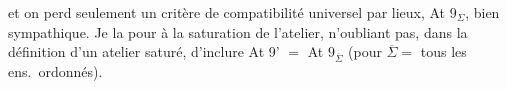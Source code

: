 \documentclass[11pt,a4paper]{article}
\begin{document}
et on perd seulement un critère de compatibilité universel par lieux, At $9_{\Sigma}$, bien sympathique. Je \ill{} la \ill{} \ill{} pour \ill{} à la saturation de l'atelier, \ill{} n'oubliant pas, dans la définition d'un atelier saturé, d'inclure At 9' $=$ At $9_{\overline{\Sigma}}$ (pour $\overline{\Sigma} =$ tous les ens.\ ordonnés).
\end{document}
